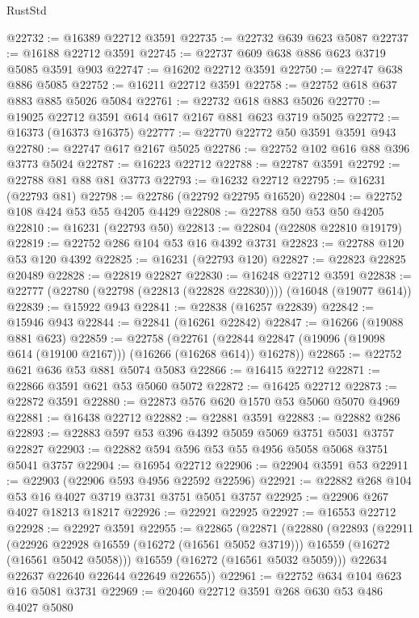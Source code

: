 \begin{lexlean}{RustStd}
\begin{coremodule}
@22732 := @16389 @22712 @3591
@22735 := @22732 @639 @623 @5087
@22737 := @16188 @22712 @3591
@22745 := @22737 @609 @638 @886 @623 @3719 @5085 @3591 @903
@22747 := @16202 @22712 @3591
@22750 := @22747 @638 @886 @5085
@22752 := @16211 @22712 @3591
@22758 := @22752 @618 @637 @883 @885 @5026 @5084
@22761 := @22732 @618 @883 @5026
@22770 := @19025 @22712 @3591 @614 @617 @2167 @881 @623 @3719 @5025
@22772 := @16373 (@16373 @16375)
@22777 := @22770 @22772 @50 @3591 @3591 @943
@22780 := @22747 @617 @2167 @5025
@22786 := @22752 @102 @616 @88 @396 @3773 @5024
@22787 := @16223 @22712
@22788 := @22787 @3591
@22792 := @22788 @81 @88 @81 @3773
@22793 := @16232 @22712
@22795 := @16231 (@22793 @81)
@22798 := @22786 (@22792 @22795 @16520)
@22804 := @22752 @108 @424 @53 @55 @4205 @4429
@22808 := @22788 @50 @53 @50 @4205
@22810 := @16231 (@22793 @50)
@22813 := @22804 (@22808 @22810 @19179)
@22819 := @22752 @286 @104 @53 @16 @4392 @3731
@22823 := @22788 @120 @53 @120 @4392
@22825 := @16231 (@22793 @120)
@22827 := @22823 @22825 @20489
@22828 := @22819 @22827
@22830 := @16248 @22712 @3591
@22838 := @22777 (@22780 (@22798 (@22813 (@22828 @22830)))) (@16048 (@19077 @614))
@22839 := @15922 @943
@22841 := @22838 (@16257 @22839)
@22842 := @15946 @943
@22844 := @22841 (@16261 @22842)
@22847 := @16266 (@19088 @881 @623)
@22859 := @22758
    (@22761 (@22844 @22847 (@19096 (@19098 @614 (@19100 @2167))) (@16266 (@16268 @614)) @16278))
@22865 := @22752 @621 @636 @53 @881 @5074 @5083
@22866 := @16415 @22712
@22871 := @22866 @3591 @621 @53 @5060 @5072
@22872 := @16425 @22712
@22873 := @22872 @3591
@22880 := @22873 @576 @620 @1570 @53 @5060 @5070 @4969
@22881 := @16438 @22712
@22882 := @22881 @3591
@22883 := @22882 @286
@22893 := @22883 @597 @53 @396 @4392 @5059 @5069 @3751 @5031 @3757 @22827
@22903 := @22882 @594 @596 @53 @55 @4956 @5058 @5068 @3751 @5041 @3757
@22904 := @16954 @22712
@22906 := @22904 @3591 @53
@22911 := @22903 (@22906 @593 @4956 @22592 @22596)
@22921 := @22882 @268 @104 @53 @16 @4027 @3719 @3731 @3751 @5051 @3757
@22925 := @22906 @267 @4027 @18213 @18217
@22926 := @22921 @22925
@22927 := @16553 @22712
@22928 := @22927 @3591
@22955 := @22865
    (@22871
      (@22880
        (@22893
          (@22911
            (@22926 @22928 @16559 (@16272 (@16561 @5052 @3719)))
            @16559
            (@16272 (@16561 @5042 @5058)))
          @16559
          (@16272 (@16561 @5032 @5059)))
        @22634
        @22637
        @22640
        @22644
        @22649
        @22655))
@22961 := @22752 @634 @104 @623 @16 @5081 @3731
@22969 := @20460 @22712 @3591 @268 @630 @53 @486 @4027 @5080

\end{coremodule}
\end{lexlean}
